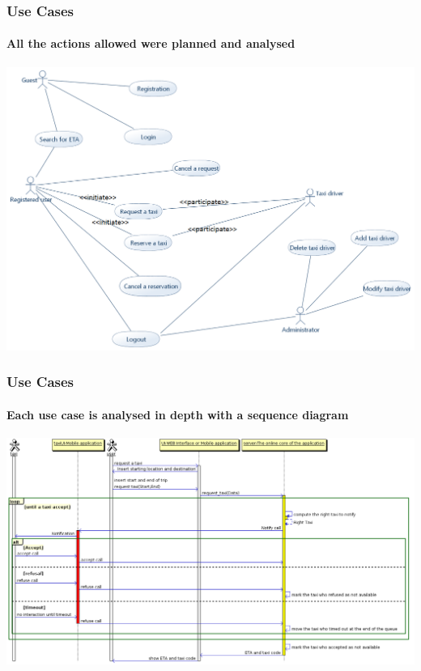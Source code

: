 \documentclass[10pt,xcolor={usenames,dvipsnames}]{beamer}
\begin{document}
\begin{frame}
	\frametitle{Use Cases}
	\framesubtitle{All the actions allowed were planned and analysed}
	\begin{center}
		\includegraphics[width=\textwidth,height=\textheight,keepaspectratio]{UseCaseDiagram}
	\end{center}
\end{frame}
\begin{frame}
	\frametitle{Use Cases}
	\framesubtitle{Each use case is analysed in depth with a sequence diagram}
	\begin{center}
		\includegraphics[width=\textwidth,height=\textheight,keepaspectratio]{request-a-taxi}
	\end{center}
\end{frame}
\end{document}
